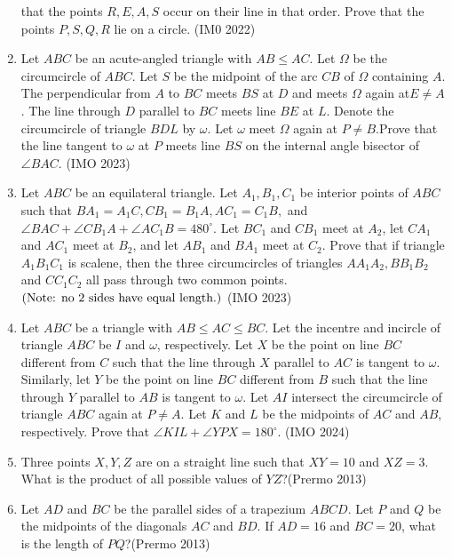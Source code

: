 \begin{enumerate}
that the points $ R, E, A, S $ occur on their line in that order. Prove that the points $ P, S, Q, R $ lie on a circle. \hfill(IM0 2022)
\item
Let  $ABC$ be an acute-angled triangle with  $AB \leq AC$. Let $\Omega$  be the circumcircle of  $ABC$.  Let  $S$ be the midpoint of the arc  $CB$  of  $\Omega$ containing $A$.  The perpendicular from $A$  to  $BC$ meets  $BS$  at  $D$  and meets  $\Omega$  again at$E \neq A$. The line through $
D$ parallel to  $BC$  meets line  $BE$ at  $L$.  Denote the circumcircle of triangle  $BDL$  by  $\omega$.  Let  $\omega$  meet  $\Omega$  again at  $P \neq B$.Prove that the line tangent to $\omega$ at  $P$  meets line $BS$  on the internal angle bisector of  $\angle{BAC}$. \hfill(IMO 2023)
\item
Let  $ABC$  be an equilateral triangle. Let $A_{1}, B_{1}, C_{1}$  be interior points of  $ABC$  such that $ BA_{1} = A_{1}C, CB_{1} = B_{1}A, AC_{1} = C_{1}B,$  and $\angle{BAC} + \angle{CB_{1}A} + \angle{AC_{1}B} = 480^{\circ}.$  Let $ BC_{1}$ and $CB_{1}$  meet at $A_{2}$,  let  $CA_{1}$ and  $A
C_{1}$  meet at  $B_{2}$,  and let  $AB_{1}$ and  $BA_{1}$  meet at  $C_{2}$. Prove that if triangle  $A_{1}B_{1}C_{1}$  is scalene, then the three circumcircles of triangles $AA_{1}A_{2}, BB_{1}B_{2}$  and  $CC_{1}C_{2}$ all pass through two common points.
$\left(\text{Note: no 2 sides have equal length.}\right)$ \hfill(IMO 2023)
\item
Let  $ABC$  be a triangle with $ AB \leq AC \leq BC $.  Let the incentre and incircle of triangle   $ABC$  be  $I$ and  $\omega$, respectively. Let $X$ be the point on line  $BC$  different from  $C$  such that the line   through  $X$  parallel to  $AC$  is tangent to  $\omega$.  Similarly, let  $
Y$ be the point on line  $BC$  different from  $B$  such that the line through  $Y$ parallel to  $AB$  is tangent to  $\omega$.  Let $AI$  intersect the circumcircle of  triangle $ABC$  again at  $P \neq A$. Let  $K$  and $L$  be the midpoints of  $AC$  and  $AB$,  respectively.  Prove that  $\angle{KIL} + \angle{YPX} = 180^{\circ}.$ \hfill(IMO 2024)
\item Three points $ X, Y, Z $ are on a straight line such that $ XY = 10 $ and $ XZ = 3 $. What is the product of all possible values of $ YZ $?\hfill(Prermo 2013)

\item Let $ AD $ and $ BC $ be the parallel sides of a trapezium $ ABCD $. Let $ P $ and $ Q $ be the midpoints of the diagonals $ AC $ and $ BD $. If $ AD = 16 $ and $ BC = 20 $, what is the length of $ PQ $?\hfill(Prermo 2013)


\end{enumerate}
